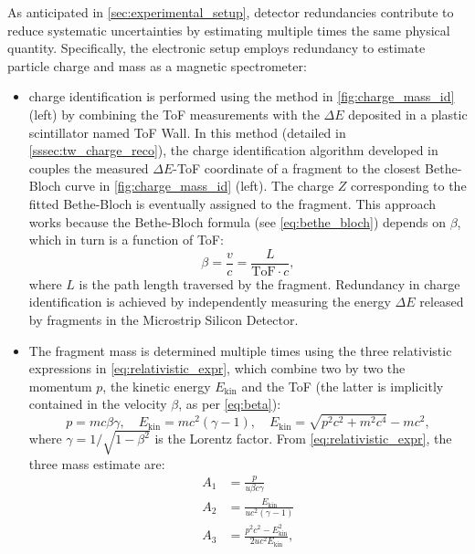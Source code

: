 As anticipated in \autoref{sec:experimental_setup}, detector redundancies contribute to reduce systematic uncertainties by estimating multiple times the same physical quantity. Specifically, the electronic setup employs redundancy to estimate particle charge and mass as a magnetic spectrometer:
\begin{itemize}
	\item charge identification is performed using the method in \autoref{fig:charge_mass_id} (left) by combining the ToF measurements with the $\Delta E$ deposited in a plastic scintillator named ToF Wall. In this method (detailed in \autoref{sssec:tw_charge_reco}), the charge identification algorithm developed in \cite{10.3389/fphy.2022.979229} couples the measured $\Delta E$-ToF coordinate of a fragment to the closest Bethe-Bloch curve in \autoref{fig:charge_mass_id} (left). The charge $Z$ corresponding to the fitted Bethe-Bloch is eventually assigned to the fragment. This approach works because the Bethe-Bloch formula (see \autoref{eq:bethe_bloch}) depends on $\beta$, which in turn is a function of ToF:
	\begin{equation}
		\beta=\frac{v}{c}=\frac{L}{\text{ToF}\cdot c},
		\label{eq:beta}
	\end{equation}
	where $L$ is the path length traversed by the fragment. Redundancy in charge identification is achieved by independently measuring the energy $\Delta E$ released by fragments in the Microstrip Silicon Detector.
	\item The fragment mass is determined multiple times using the three relativistic expressions in \autoref{eq:relativistic_expr}, which combine two by two the momentum $p$, the kinetic energy $E_\text{kin}$ and the ToF (the latter is implicitly contained in the velocity $\beta$, as per \autoref{eq:beta}):
	\begin{equation}
		p=mc\beta\gamma,\quad
		E_\text{kin}=mc^2\left(\gamma-1\right),\quad
		E_\text{kin}=\sqrt{p^2c^2+m^2c^4}-mc^2,
		\label{eq:relativistic_expr}
	\end{equation}
	where $\gamma=1/\sqrt{1-\beta^2}$ is the Lorentz factor. From \autoref{eq:relativistic_expr}, the three mass estimate are:
	\begin{subequations}
		\begin{align}
			\label{eq:a1}
			A_1&=\frac{p}{u\beta c\gamma}\\
			\label{eq:a2}
			A_2&=\frac{E_\text{kin}}{uc^2\left(\gamma-1\right)}\\
			\label{eq:a3}
			A_3&=\frac{p^2c^2-E_\text{kin}^2}{2uc^2E_\text{kin}},

\end{align}
\end{subequations}
\end{itemize}
